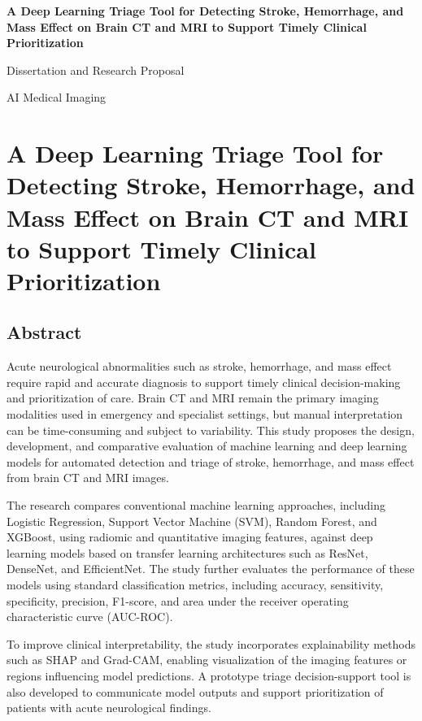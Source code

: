 \documentclass[12pt,a4paper]{report}
\begin{document}
\begin{titlepage}
\centering
\vspace*{2cm}
{\LARGE\bfseries A Deep Learning Triage Tool for Detecting Stroke, Hemorrhage, and Mass Effect on Brain CT and MRI to Support Timely Clinical Prioritization\par}
\vfill
{\large Dissertation and Research Proposal\par}
\vspace{1cm}
{\large AI Medical Imaging\par}
\end{titlepage}
\tableofcontents
\clearpage
\chapter{A Deep Learning Triage Tool for Detecting Stroke, Hemorrhage, and Mass Effect on Brain CT and MRI to Support Timely Clinical Prioritization}

\section{Abstract}

Acute neurological abnormalities such as stroke, hemorrhage, and mass effect require rapid and accurate diagnosis to support timely clinical decision-making and prioritization of care. Brain CT and MRI remain the primary imaging modalities used in emergency and specialist settings, but manual interpretation can be time-consuming and subject to variability. This study proposes the design, development, and comparative evaluation of machine learning and deep learning models for automated detection and triage of stroke, hemorrhage, and mass effect from brain CT and MRI images.

The research compares conventional machine learning approaches, including Logistic Regression, Support Vector Machine (SVM), Random Forest, and XGBoost, using radiomic and quantitative imaging features, against deep learning models based on transfer learning architectures such as ResNet, DenseNet, and EfficientNet. The study further evaluates the performance of these models using standard classification metrics, including accuracy, sensitivity, specificity, precision, F1-score, and area under the receiver operating characteristic curve (AUC-ROC).

To improve clinical interpretability, the study incorporates explainability methods such as SHAP and Grad-CAM, enabling visualization of the imaging features or regions influencing model predictions. A prototype triage decision-support tool is also developed to communicate model outputs and support prioritization of patients with acute neurological findings.
\end{document}
